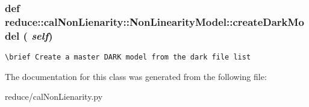 \subsubsection{\setlength{\rightskip}{0pt plus 5cm}def reduce::cal\-Non\-Lienarity::Non\-Linearity\-Model::create\-Dark\-Model ( {\em self})}\label{classreduce_1_1calNonLienarity_1_1NonLinearityModel_3cef1c99ebd5d40780ee75f6b55b7a6e}




\footnotesize\begin{verbatim}
\brief Create a master DARK model from the dark file list
\end{verbatim}
\normalsize
 

The documentation for this class was generated from the following file:\begin{CompactItemize}
\item 
reduce/cal\-Non\-Lienarity.py\end{CompactItemize}
